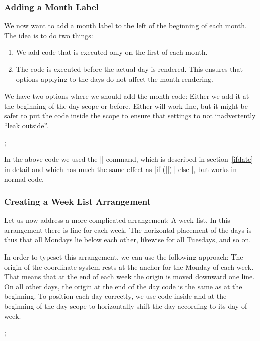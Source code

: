 \subsubsection{Adding a Month Label}

We now want to add a month label to the left of the beginning of each month.
The idea is to do two things:
%
\begin{enumerate}
    \item We add code that is executed only on the first of each month.
    \item The code is executed before the actual day is rendered. This ensures
        that options applying to the days do not affect the month rendering.
\end{enumerate}
%
We have two options where we should add the month code: Either we add it at the
beginning of the day scope or before. Either will work fine, but it might be
safer to put the code inside the scope to ensure that settings to not
inadvertently ``leak outside''.
%
\begin{codeexample}[preamble={\usetikzlibrary{calendar}}]
\tikz
  \calendar
    [dates=2000-01-01 to 2000-01-08,
     execute after day scope={\pgftransformyshift{-1em}},
     execute at begin day scope=
       {\ifdate{day of month=1}{\tikzmonthcode}{}},
     every month/.append style={anchor=base east,xshift=-2em}];
\end{codeexample}

In the above code we used the |\ifdate| command, which is described in section~\ref{ifdate} in
detail and which has much the same effect as
|if (||)|| else |, but works in
normal code.


\subsubsection{Creating a Week List Arrangement}

Let us now address a more complicated arrangement: A week list. In this
arrangement there is line for each week. The horizontal placement of the days
is thus that all Mondays lie below each other, likewise for all Tuesdays, and
so on.

In order to typeset this arrangement, we can use the following approach: The
origin of the coordinate system rests at the anchor for the Monday of each
week. That means that at the end of each week the origin is moved downward one
line. On all other days, the origin at the end of the day code is the same as
at the beginning. To position each day correctly, we use code inside and at the
beginning of the day scope to horizontally shift the day according to its day
of week.
%
\begin{codeexample}[preamble={\usetikzlibrary{calendar}}]
\tikz
  \calendar
    [dates=2000-01-01 to 2000-01-20,
     execute at begin day scope=
       {\pgftransformxshift{\pgfcalendarcurrentweekday em}},
     execute after day scope=
       {\ifdate{Sunday}{\pgftransformyshift{-1em}}{}}];
\end{codeexample}


